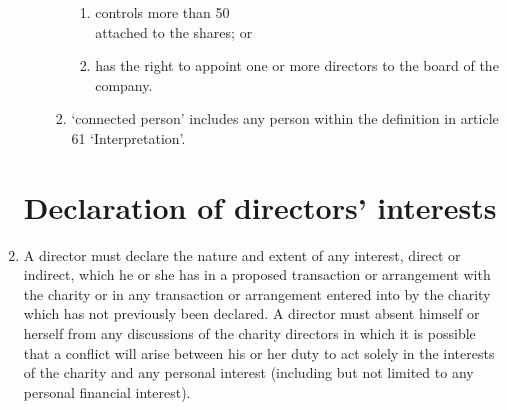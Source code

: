 \documentclass{article}
\begin{document}
\begin{enumerate}[label=\arabic*]
\begin{enumerate}[label=(\arabic*)]
\begin{enumerate}[label=(\alph*)]
\begin{enumerate}[label=(\roman*)]
                \item controls more than 50\\%
                attached to the shares; or
                \item has the right to appoint one or more directors to the
                board of the company.
            \end{enumerate}
            \item `connected person' includes any person within the
            definition in article 61 `Interpretation'.
        \end{enumerate}
    \end{enumerate}
    
    \section{Declaration of directors' interests}
    \item A director must declare the nature and extent of any interest, direct or
    indirect, which he or she has in a proposed transaction or arrangement
    with the charity or in any transaction or arrangement entered into by
    the charity which has not previously been declared. A director must
    absent himself or herself from any discussions of the charity directors
    in which it is possible that a conflict will arise between his or her duty
    to act solely in the interests of the charity and any personal interest
    (including but not limited to any personal financial interest).
    

\end{enumerate}
\end{document}

